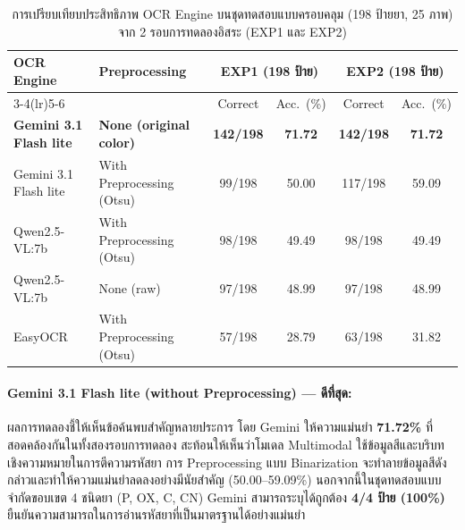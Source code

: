 \begin{table}[H]
  \centering
  \caption{การเปรียบเทียบประสิทธิภาพ OCR Engine บนชุดทดสอบแบบครอบคลุม (198 ป้ายยา, 25 ภาพ) จาก 2 รอบการทดลองอิสระ (EXP1 และ EXP2)}
  \label{tab:ocr_multimodel}
  \renewcommand{\arraystretch}{1.15}
  \begin{tabular}{llcccc}
    \toprule
    \multirow{2}{*}{\textbf{OCR Engine}} & \multirow{2}{*}{\textbf{Preprocessing}} &
    \multicolumn{2}{c}{\textbf{EXP1 (198 ป้าย)}} & \multicolumn{2}{c}{\textbf{EXP2 (198 ป้าย)}} \\
    \cmidrule(lr){3-4}\cmidrule(lr){5-6}
    & & Correct & Acc.~(\%) & Correct & Acc.~(\%) \\
    \midrule
    \textbf{Gemini 3.1 Flash lite} & \textbf{None (original color)} & \textbf{142/198} & \textbf{71.72} & \textbf{142/198} & \textbf{71.72} \\
    Gemini 3.1 Flash lite          & With Preprocessing (Otsu)     & 99/198  & 50.00 & 117/198 & 59.09 \\
    Qwen2.5-VL:7b                  & With Preprocessing (Otsu)     & 98/198  & 49.49 & 98/198  & 49.49 \\
    Qwen2.5-VL:7b                  & None (raw)                    & 97/198  & 48.99 & 97/198  & 48.99 \\
    EasyOCR                        & With Preprocessing (Otsu)     & 57/198  & 28.79 & 63/198  & 31.82 \\
    \bottomrule
  \end{tabular}
\end{table}

\paragraph{Gemini 3.1 Flash lite (without Preprocessing) — ดีที่สุด:}
ผลการทดลองชี้ให้เห็นข้อค้นพบสำคัญหลายประการ โดย Gemini ให้ความแม่นยำ \textbf{71.72\%} ที่สอดคล้องกันในทั้งสองรอบการทดลอง สะท้อนให้เห็นว่าโมเดล Multimodal ใช้ข้อมูลสีและบริบทเชิงความหมายในการตีความรหัสยา การ Preprocessing แบบ Binarization จะทำลายข้อมูลสีดังกล่าวและทำให้ความแม่นยำลดลงอย่างมีนัยสำคัญ (50.00--59.09\%) นอกจากนี้ในชุดทดสอบแบบจำกัดขอบเขต 4 ชนิดยา (P, OX, C, CN) Gemini สามารถระบุได้ถูกต้อง \textbf{4/4 ป้าย (100\%)} ยืนยันความสามารถในการอ่านรหัสยาที่เป็นมาตรฐานได้อย่างแม่นยำ

